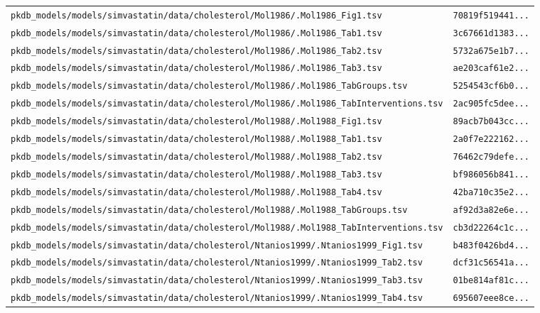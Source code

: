 \begin{longtable}{ll}
\texttt{pkdb\_models/models/simvastatin/data/cholesterol/Mol1986/.Mol1986\_Fig1.tsv} & \texttt{70819f519441...} \\
\texttt{pkdb\_models/models/simvastatin/data/cholesterol/Mol1986/.Mol1986\_Tab1.tsv} & \texttt{3c67661d1383...} \\
\texttt{pkdb\_models/models/simvastatin/data/cholesterol/Mol1986/.Mol1986\_Tab2.tsv} & \texttt{5732a675e1b7...} \\
\texttt{pkdb\_models/models/simvastatin/data/cholesterol/Mol1986/.Mol1986\_Tab3.tsv} & \texttt{ae203caf61e2...} \\
\texttt{pkdb\_models/models/simvastatin/data/cholesterol/Mol1986/.Mol1986\_TabGroups.tsv} & \texttt{5254543cf6b0...} \\
\texttt{pkdb\_models/models/simvastatin/data/cholesterol/Mol1986/.Mol1986\_TabInterventions.tsv} & \texttt{2ac905fc5dee...} \\
\texttt{pkdb\_models/models/simvastatin/data/cholesterol/Mol1988/.Mol1988\_Fig1.tsv} & \texttt{89acb7b043cc...} \\
\texttt{pkdb\_models/models/simvastatin/data/cholesterol/Mol1988/.Mol1988\_Tab1.tsv} & \texttt{2a0f7e222162...} \\
\texttt{pkdb\_models/models/simvastatin/data/cholesterol/Mol1988/.Mol1988\_Tab2.tsv} & \texttt{76462c79defe...} \\
\texttt{pkdb\_models/models/simvastatin/data/cholesterol/Mol1988/.Mol1988\_Tab3.tsv} & \texttt{bf986056b841...} \\
\texttt{pkdb\_models/models/simvastatin/data/cholesterol/Mol1988/.Mol1988\_Tab4.tsv} & \texttt{42ba710c35e2...} \\
\texttt{pkdb\_models/models/simvastatin/data/cholesterol/Mol1988/.Mol1988\_TabGroups.tsv} & \texttt{af92d3a82e6e...} \\
\texttt{pkdb\_models/models/simvastatin/data/cholesterol/Mol1988/.Mol1988\_TabInterventions.tsv} & \texttt{cb3d22264c1c...} \\
\texttt{pkdb\_models/models/simvastatin/data/cholesterol/Ntanios1999/.Ntanios1999\_Fig1.tsv} & \texttt{b483f0426bd4...} \\
\texttt{pkdb\_models/models/simvastatin/data/cholesterol/Ntanios1999/.Ntanios1999\_Tab2.tsv} & \texttt{dcf31c56541a...} \\
\texttt{pkdb\_models/models/simvastatin/data/cholesterol/Ntanios1999/.Ntanios1999\_Tab3.tsv} & \texttt{01be814af81c...} \\
\texttt{pkdb\_models/models/simvastatin/data/cholesterol/Ntanios1999/.Ntanios1999\_Tab4.tsv} & \texttt{695607eee8ce...} \\

\end{longtable}
